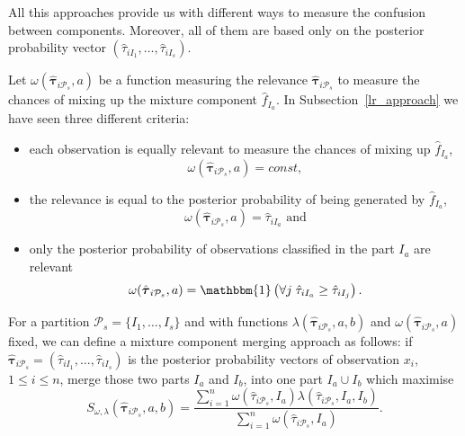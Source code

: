 \documentclass[10pt, a4paper]{article}
\newcommand{\m}[1]{\boldsymbol{#1}}
\begin{document}
\begin{spacing}{1.9}
All this approaches provide us with different ways to measure the confusion between components. Moreover, all of them are based only on the posterior probability
vector $(\hat{\tau}_{i I_{1}}, \dots, \hat{\tau}_{i I_{s}})$.

Let $\omega(\hat{\m \tau}_{i \mathcal{P}_s}, a)$ be a function measuring the relevance $\hat{\m \tau}_{i \mathcal{P}_s}$ to measure the chances of mixing up  the mixture component $\hat{f}_{I_a}$. In Subsection~\ref{lr_approach} we have seen three different criteria:

\begin{itemize}
\item each observation is equally relevant to measure the chances of mixing up  $\hat{f}_{I_a}$,
\[\omega(\hat{\m \tau}_{i \mathcal{P}_s}, a) = const,\]
\item the relevance is equal to the posterior probability of being generated by  $\hat{f}_{I_a}$,
\[\omega(\hat{\m \tau}_{i \mathcal{P}_s}, a) =  \hat{\tau}_{iI_a} \text{ and}\]
\item  only the posterior probability of observations classified in the part   $I_a$ are relevant
\[\omega(\hat{\m \tau}_{i \mathcal{P}_s}, a) = \mathbbm{1}\left( \forall j\; \hat{\tau}_{i I_{a}} \geq \hat{\tau}_{iI_j} \right).\]
\end{itemize}



For a partition $\mathcal{P}_s = \{ I_1, \dots, I_s\}$ and with  functions $\lambda(\hat{\m \tau}_{i \mathcal{P}_s}, a, b)$ and $\omega(\hat{\m \tau}_{i \mathcal{P}_s}, a)$ fixed, we can define a mixture component merging approach as follows: if $\hat{\m\tau}_{i \mathcal{P}_s} = \left( \hat{\tau}_{i I_1} , \dots, \hat{\tau}_{i I_s}  \right)$ is the posterior probability vectors of observation $x_i$, $1 \leq i \leq n$,  merge those two parts $I_a$ and $I_b$, into one part $I_a \cup I_b$ which maximise
\begin{equation}\label{unifying_equation}
S_{\omega, \lambda}( \hat{\m \tau}_{i \mathcal{P}_s}, a, b) = \frac{\sum_{i=1}^n \omega(\hat{\tau}_{i \mathcal{P}_s}, I_a) \lambda(\hat{\tau}_{i \mathcal{P}_s}, I_a, I_b)}{\sum_{i=1}^n \omega(\hat{\tau}_{i \mathcal{P}_s}, I_a) }.
\end{equation}



\end{spacing}
\end{document}
